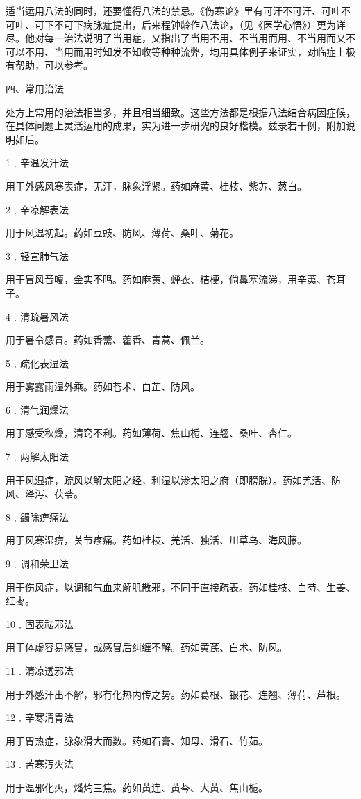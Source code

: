 \documentclass[a4paper,12pt,UTF8,twoside]{ctexbook}
\begin{document}
适当运用八法的同时，还要懂得八法的禁忌。《伤寒论》里有可汗不可汗、可吐不可吐、可下不可下病脉症提出，后来程钟龄作八法论，（见《医学心悟》）更为详尽。他对每一治法说明了当用症，又指出了当用不用、不当用而用、不当用而又不可以不用、当用而用时知发不知收等种种流弊，均用具体例子来证实，对临症上极有帮助，可以参考。

四、常用治法

处方上常用的治法相当多，并且相当细致。这些方法都是根据八法结合病因症候，在具体问题上灵活运用的成果，实为进一步研究的良好楷模。兹录若干例，附加说明如后。

1﹒辛温发汗法

用于外感风寒表症，无汗，脉象浮紧。药如麻黄、桂枝、紫苏、葱白。

2﹒辛凉解表法

用于风温初起。药如豆豉、防风、薄荷、桑叶、菊花。

3﹒轻宣肺气法

用于冒风音嗄，金实不鸣。药如麻黄、蝉衣、桔梗，倘鼻塞流涕，用辛荑、苍耳子。

4﹒清疏暑风法

用于暑令感冒。药如香薷、藿香、青蒿、佩兰。

5﹒疏化表湿法

用于雾露雨湿外乘。药如苍术、白芷、防风。

6﹒清气润燥法

用于感受秋燥，清窍不利。药如薄荷、焦山栀、连翘、桑叶、杏仁。

7﹒两解太阳法

用于风湿症，疏风以解太阳之经，利湿以渗太阳之府（即膀胱）。药如羌活、防风、泽泻、茯苓。

8﹒蠲除痹痛法

用于风寒湿痹，关节疼痛。药如桂枝、羌活、独活、川草乌、海风藤。

9﹒调和荣卫法

用于伤风症，以调和气血来解肌散邪，不同于直接疏表。药如桂枝、白芍、生姜、红枣。

10﹒固表祛邪法

用于体虚容易感冒，或感冒后纠缠不解。药如黄芪、白术、防风。

11﹒清凉透邪法

用于外感汗出不解，邪有化热内传之势。药如葛根、银花、连翘、薄荷、芦根。

12﹒辛寒清胃法

用于胃热症，脉象滑大而数。药如石膏、知母、滑石、竹茹。

13﹒苦寒泻火法

用于温邪化火，燔灼三焦。药如黄连、黄芩、大黄、焦山栀。
\end{document}
